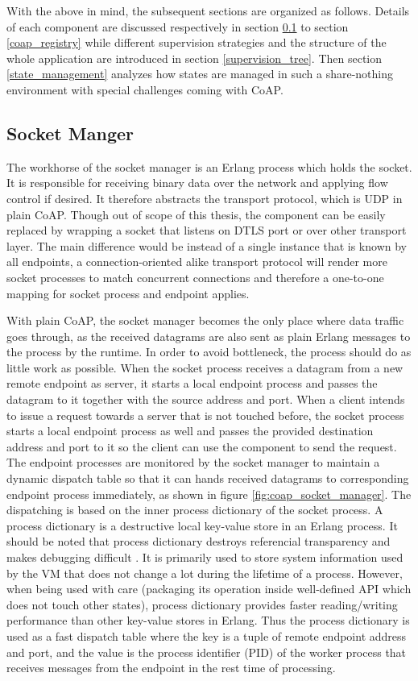 With the above in mind, the subsequent sections are organized as follows. Details of each component are discussed respectively in section \ref{socket_manager} to section \ref{coap_registry} while different supervision strategies and the structure of the whole application are introduced in section \ref{supervision_tree}. Then section \ref{state_management} analyzes how states are managed in such a share-nothing environment with special challenges coming with CoAP. 

\subsection{Socket Manger}\label{socket_manager}

The workhorse of the socket manager is an Erlang process which holds the socket. It is responsible for receiving binary data over the network and applying flow control if desired. 
It therefore abstracts the transport protocol, which is UDP in plain CoAP. Though out of scope of this thesis, the component can be easily replaced by wrapping a socket that listens on DTLS port or over other transport layer. The main difference would be instead of a single instance that is known by all endpoints, a connection-oriented alike transport protocol will render more socket processes to match concurrent connections and therefore a one-to-one mapping for socket process and endpoint applies. 

With plain CoAP, the socket manager becomes the only place where data traffic goes through, as the received datagrams are also sent as plain Erlang messages to the process by the runtime. In order to avoid bottleneck, the process should do as little work as possible. When the socket process receives a datagram from a new remote endpoint as server, it starts a local endpoint process and passes the datagram to it together with the source address and port. When a client intends to issue a request towards a server that is not touched before, the socket process starts a local endpoint process as well and passes the provided destination address and port to it so the client can use the component to send the request. The endpoint processes are monitored by the socket manager to maintain a dynamic dispatch table so that it can hands received datagrams to corresponding endpoint process immediately, as shown in figure \ref{fig:coap_socket_manager}. The dispatching is based on the inner process dictionary of the socket process. A process dictionary is a destructive local key-value store in an Erlang process. It should be noted that process dictionary destroys referencial transparency and makes debugging difficult \cite{erl_proc_dict}. It is primarily used to store system information used by the VM that does not change a lot during the lifetime of a process. However, when being used with care (packaging its operation inside well-defined API which does not touch other states), process dictionary provides faster reading/writing performance than other key-value stores in Erlang. Thus the process dictionary is used as a fast dispatch table where the key is a tuple of remote endpoint address and port, and the value is the process identifier (PID) of the worker process that receives messages from the endpoint in the rest time of processing. 

